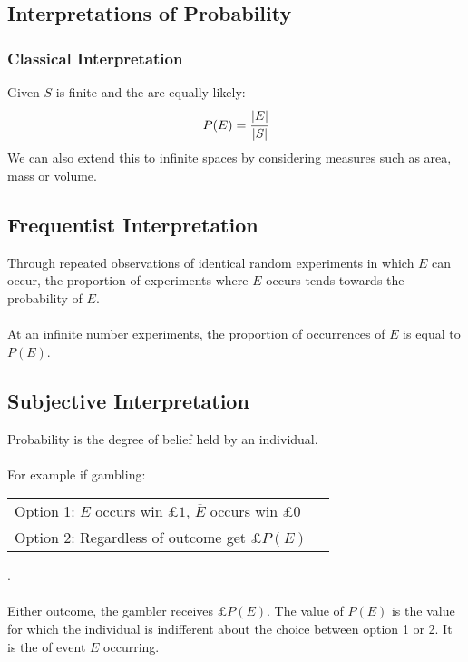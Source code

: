 \documentclass{report}
\begin{document}
\subsection*{Interpretations of Probability}
\subsubsection*{Classical Interpretation}

Given $S$ is finite and the  are equally likely:
\[P(E) = \cfrac{|E|}{|S|}\]
We can also extend this  to infinite spaces by considering measures such as area, mass or volume.

\subsection*{Frequentist Interpretation}
Through repeated observations of identical random experiments in which $E$ can occur, the proportion of experiments where $E$ occurs tends towards the probability of $E$.
\\
\\ At an infinite number experiments, the proportion of occurrences of $E$ is equal to $P(E)$.

\subsection*{Subjective Interpretation}
Probability is the degree of belief held by an individual.
\\
\\ For example if gambling: \begin{tabular}{l l}
	Option 1: $E$ occurs win $£1$, $\overline{E}$ occurs win $£0$ \\
	Option 2: Regardless of outcome get $£P(E)$                   \\
\end{tabular}.
\\
\\ Either outcome, the gambler receives $£P(E)$. The value of $P(E)$ is the value for which the individual is indifferent about the choice between option 1 or 2. It is the  of event $E$ occurring.
\end{document}
